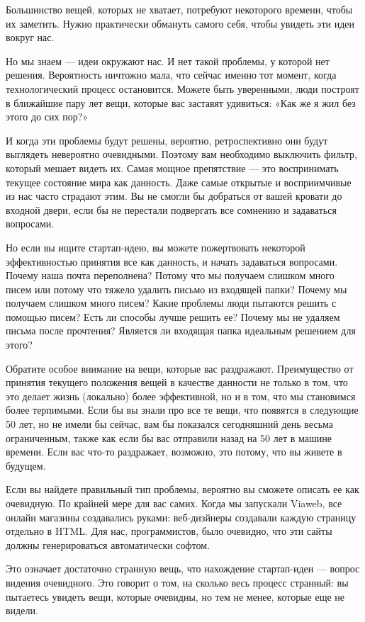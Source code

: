 \documentclass[ebook,12pt,oneside,openany]{memoir}
\begin{document}
Большинство вещей, которых не хватает, потребуют некоторого времени,
чтобы их заметить. Нужно практически обмануть самого себя, чтобы
увидеть эти идеи вокруг нас.

Но мы знаем — идеи окружают нас. И нет такой проблемы, у которой нет
решения. Вероятность ничтожно мала, что сейчас именно тот момент,
когда технологический процесс остановится. Можете быть уверенными,
люди построят в ближайшие пару лет вещи, которые вас заставят
удивиться: «Как же я жил без этого до сих пор?»

И когда эти проблемы будут решены, вероятно, ретроспективно они будут
выглядеть невероятно очевидными. Поэтому вам необходимо выключить
фильтр, который мешает видеть их. Самая мощное препятствие — это
воспринимать текущее состояние мира как данность. Даже самые открытые
и восприимчивые из нас часто страдают этим. Вы не смогли бы добраться
от вашей кровати до входной двери, если бы не перестали подвергать все
сомнению и задаваться вопросами.

Но если вы ищите стартап-идею, вы можете пожертвовать некоторой
эффективностью принятия все как данность, и начать задаваться
вопросами. Почему наша почта переполнена? Потому что мы получаем
слишком много писем или потому что тяжело удалить письмо из входящей
папки? Почему мы получаем слишком много писем? Какие проблемы люди
пытаются решить с помощью писем? Есть ли способы лучше решить ее?
Почему мы не удаляем письма после прочтения? Является ли входящая
папка идеальным решением для этого?

Обратите особое внимание на вещи, которые вас раздражают. Преимущество
от принятия текущего положения вещей в качестве данности не только в
том, что это делает жизнь (локально) более эффективной, но и в том,
что мы становимся более терпимыми. Если бы вы знали про все те вещи,
что появятся в следующие 50 лет, но не имели бы сейчас, вам бы
показался сегодняшний день весьма ограниченным, также как если бы вас
отправили назад на 50 лет в машине времени. Если вас что-то
раздражает, возможно, это потому, что вы живете в будущем.

Если вы найдете правильный тип проблемы, вероятно вы сможете описать
ее как очевидную. По крайней мере для вас самих. Когда мы запускали
Viaweb, все онлайн магазины создавались руками: веб-дизйнеры создавали
каждую страницу отдельно в HTML. Для нас, программистов, было
очевидно, что эти сайты должны генерироваться автоматически софтом.

Это означает достаточно странную вещь, что нахождение стартап-идеи —
вопрос видения очевидного. Это говорит о том, на сколько весь процесс
странный: вы пытаетесь увидеть вещи, которые очевидны, но тем не
менее, которые еще не видели.
\end{document}
